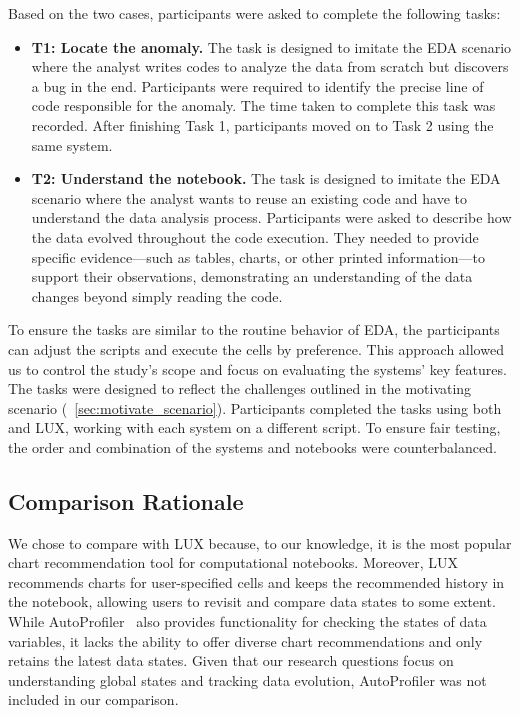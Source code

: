 Based on the two cases, participants were asked to complete the following tasks:

\begin{itemize}
    \item \textbf{T1: Locate the anomaly. } The task is designed to imitate the EDA scenario where the analyst writes codes to analyze the data from scratch but discovers a bug in the end. Participants were required to identify the precise line of code responsible for the anomaly. The time taken to complete this task was recorded. After finishing Task 1, participants moved on to Task 2 using the same system.
    
    \item \textbf{T2: Understand the notebook. } The task is designed to imitate the EDA scenario where the analyst wants to reuse an existing code and have to understand the data analysis process.
    Participants were asked to describe how the data evolved throughout the code execution. 
    They needed to provide specific evidence—such as tables, charts, or other printed information—to support their observations, demonstrating an understanding of the data changes beyond simply reading the code. 
\end{itemize}

To ensure the tasks are similar to the routine behavior of EDA, the participants can adjust the scripts and execute the cells by preference.
This approach allowed us to control the study's scope and focus on evaluating the systems' key features. The tasks were designed to reflect the challenges outlined in the motivating scenario (~\autoref{sec:motivate_scenario}). 
Participants completed the tasks using both \system{} and LUX, working with each system on a different script.
To ensure fair testing, the order and combination of the systems and notebooks were counterbalanced. 



\subsection{Comparison Rationale}
We chose to compare \system{} with LUX because, to our knowledge, it is the most popular chart recommendation tool for computational notebooks. 
Moreover, LUX recommends charts for user-specified cells and keeps the recommended history in the notebook, allowing users to revisit and compare data states to some extent. 
While AutoProfiler~\cite{autoprofiler} also provides functionality for checking the states of data variables, it lacks the ability to offer diverse chart recommendations and only retains the latest data states. 
Given that our research questions focus on understanding global states and tracking data evolution, AutoProfiler was not included in our comparison.

